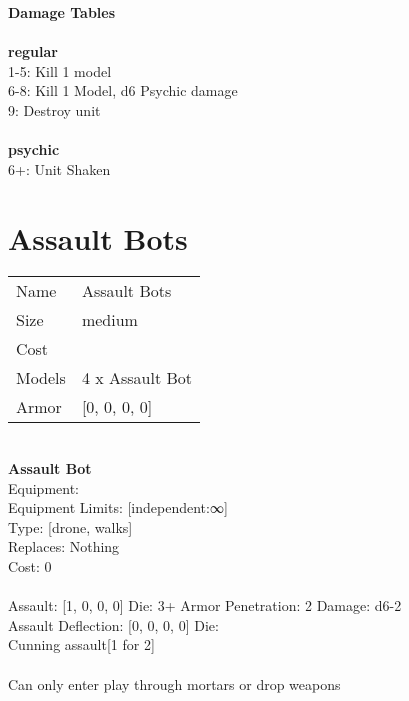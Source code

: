 {\bf Damage Tables} \\
\ \\ {\bf regular } \\
1-5: Kill 1 model \\
6-8: Kill 1 Model, d6 Psychic damage \\
9: Destroy unit \\
\ \\ {\bf psychic } \\
6+: Unit Shaken \\










\pagebreak\pagebreak

\section{ Assault Bots }

\begin{tabular}{ll}
  Name & Assault Bots \\
  Size & medium\\
  Cost & \\
  Models & 4 x Assault Bot\\
  Armor & [0, 0, 0, 0]\\
\end{tabular}

\noindent \\ 


{\bf Assault Bot } \\
Equipment:  \\
Equipment Limits: [independent:∞] \\
Type: [drone, walks] \\
Replaces: Nothing \\
Cost: 0\\
\ \\
Assault: [1, 0, 0, 0] Die: 3+ Armor Penetration: 2 Damage: d6-2 \\
Assault Deflection: [0, 0, 0, 0] Die: \\
\indent Cunning assault[1 for 2]\\ 
 
\ \\
Can only enter play through mortars or drop weapons\\ 

\ \\
 
\ \\



